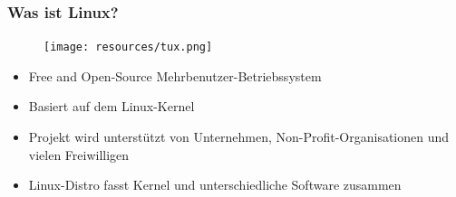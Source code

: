 
\begin{frame}
\frametitle{Was ist Linux?}
\begin{figure}
\texttt{[image: resources/tux.png]}
\end{figure}
\begin{itemize}
	\item Free and Open-Source Mehrbenutzer-Betriebssystem
	\item Basiert auf dem Linux-Kernel
	\item Projekt wird unterstützt von Unternehmen, Non-Profit-Organisationen und vielen Freiwilligen
	\item Linux-Distro fasst Kernel und unterschiedliche Software zusammen
\end{itemize}
\end{frame}

